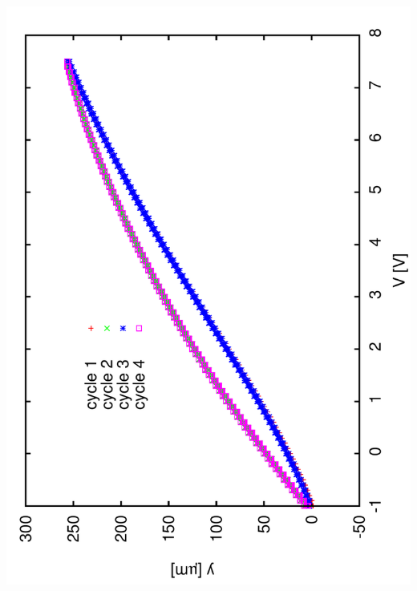 \documentclass[a4paper,11pt]{book}
\begin{document}
\includegraphics[angle=-90,scale=0.15]{image32.pdf}
\end{document}
